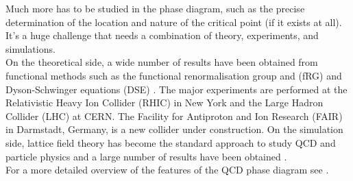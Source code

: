 Much more has to be studied in the phase diagram, such as the precise determination of the location and nature of the critical point (if it exists at all). It's a huge challenge that needs a combination of theory, experiments, and simulations. \\
On the theoretical side, a wide number of results have been obtained from functional methods such as the functional renormalisation group and (fRG) and Dyson-Schwinger equations (DSE) \cite{QCDphase,QCDphase2,Gao_2021}.
The major experiments are performed at the Relativistic Heavy Ion Collider (RHIC) in New York and the Large Hadron
Collider (LHC) at CERN. The Facility for Antiproton and Ion Research (FAIR) in Darmstadt, Germany, is a new collider under construction. On the simulation side, lattice field theory has become the standard approach to study QCD and particle physics and a large number of results have been obtained \cite{wuppertal,201915,Endroedi_2014,sym13112079}. \\
For a more detailed overview of the features of the QCD phase diagram see \cite{phasediag1,Bellwied2015}.
